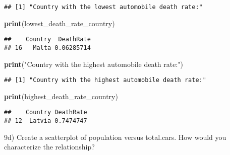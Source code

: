 \documentclass[
]{article}
\newenvironment{Shaded}{\begin{snugshade}}{\end{snugshade}}
\newcommand{\AttributeTok}[1]{\textcolor[rgb]{0.13,0.29,0.53}{#1}}
\newcommand{\CommentTok}[1]{\textcolor[rgb]{0.56,0.35,0.01}{\textit{#1}}}
\newcommand{\FunctionTok}[1]{\textcolor[rgb]{0.13,0.29,0.53}{\textbf{#1}}}
\newcommand{\NormalTok}[1]{#1}
\newcommand{\OtherTok}[1]{\textcolor[rgb]{0.56,0.35,0.01}{#1}}
\newcommand{\SpecialCharTok}[1]{\textcolor[rgb]{0.81,0.36,0.00}{\textbf{#1}}}
\newcommand{\StringTok}[1]{\textcolor[rgb]{0.31,0.60,0.02}{#1}}
\begin{document}
\begin{verbatim}
## [1] "Country with the lowest automobile death rate:"
\end{verbatim}

\begin{Shaded}
\begin{Highlighting}[]
\FunctionTok{print}\NormalTok{(lowest\_death\_rate\_country)}
\end{Highlighting}
\end{Shaded}

\begin{verbatim}
##    Country  DeathRate
## 16   Malta 0.06285714
\end{verbatim}

\begin{Shaded}
\begin{Highlighting}[]
\FunctionTok{print}\NormalTok{(}\StringTok{"Country with the highest automobile death rate:"}\NormalTok{)}
\end{Highlighting}
\end{Shaded}

\begin{verbatim}
## [1] "Country with the highest automobile death rate:"
\end{verbatim}

\begin{Shaded}
\begin{Highlighting}[]
\FunctionTok{print}\NormalTok{(highest\_death\_rate\_country)}
\end{Highlighting}
\end{Shaded}

\begin{verbatim}
##    Country DeathRate
## 12  Latvia 0.7474747
\end{verbatim}

9d) Create a scatterplot of population versus total.cars. How would you
characterize the relationship?

\begin{Shaded}
\end{Shaded}
\end{document}
